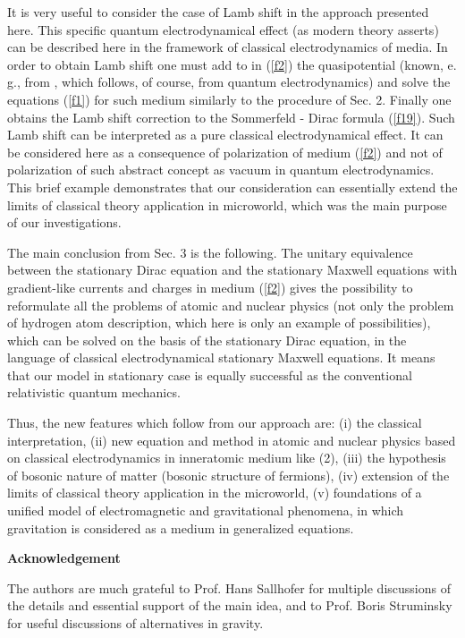 \documentclass[a4paper,12pt]{article}
\begin{document}
It is very useful to consider the case of Lamb shift in the approach
presented here. This specific quantum electrodynamical effect (as modern
theory asserts) can be described here in the framework of classical
electrodynamics of media. In order to obtain Lamb shift one must add to \coordHE{} in (\ref{f2}) the
quasipotential (known, e. g., from \cite{HAL}, which follows, of course,
from quantum electrodynamics) and solve the equations (\ref{f1}) for such
medium similarly to the procedure of Sec. 2. Finally one obtains the Lamb
shift correction to the Sommerfeld - Dirac formula (\ref{f19}). Such Lamb
shift can be interpreted as a pure classical electrodynamical effect. It can
be considered here as a consequence of polarization of medium (\ref{f2}) and
not of polarization of such abstract concept as vacuum in quantum
electrodynamics. This brief example demonstrates that our consideration can
essentially extend the limits of classical theory application in microworld,
which was the main purpose of our investigations.

The main conclusion from Sec. 3 is the following. The unitary equivalence
between the stationary Dirac equation and the stationary Maxwell equations
with gradient-like currents and charges in medium (\ref{f2}) gives the
possibility to reformulate all the problems of atomic and nuclear physics
(not only the problem of hydrogen atom description, which here is only an
example of possibilities), which can be solved on the basis of the
stationary Dirac equation, in the language of classical electrodynamical
stationary Maxwell equations. It means that our model in stationary case is
equally successful as the conventional relativistic quantum mechanics.

Thus, the new features which follow from our approach are: (i) the classical
interpretation, (ii) new equation and method in atomic and nuclear physics
based on classical electrodynamics in inneratomic medium like (2), (iii) the
hypothesis of bosonic nature of matter (bosonic structure of fermions), (iv)
extension of the limits of classical theory application in the microworld,
(v) foundations of a unified model of electromagnetic and gravitational
phenomena, in which gravitation is considered as a medium in generalized
equations.

\begin{center}
\textbf{Acknowledgement}
\end{center}

The authors are much grateful to Prof. Hans Sallhofer for multiple
discussions of the details and essential support of the main idea, and to
Prof. Boris Struminsky for useful discussions of alternatives in gravity.
\end{document}
